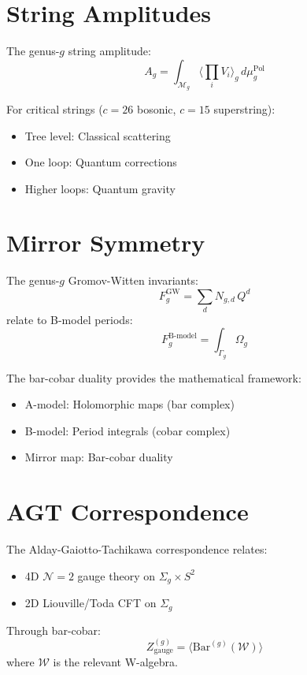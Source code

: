 \section{String Amplitudes}

The genus-$g$ string amplitude:
$$A_g = \int_{\mathcal{M}_g} \langle \prod_i V_i \rangle_g \, d\mu_g^{\text{Pol}}$$

For critical strings ($c=26$ bosonic, $c=15$ superstring):
\begin{itemize}
\item Tree level: Classical scattering
\item One loop: Quantum corrections
\item Higher loops: Quantum gravity
\end{itemize}

\section{Mirror Symmetry}

The genus-$g$ Gromov-Witten invariants:
$$F_g^{\text{GW}} = \sum_{d} N_{g,d} \, Q^d$$
relate to B-model periods:
$$F_g^{\text{B-model}} = \int_{\Gamma_g} \Omega_g$$

The bar-cobar duality provides the mathematical framework:
\begin{itemize}
\item A-model: Holomorphic maps (bar complex)
\item B-model: Period integrals (cobar complex)
\item Mirror map: Bar-cobar duality
\end{itemize}

\section{AGT Correspondence}

The Alday-Gaiotto-Tachikawa correspondence relates:
\begin{itemize}
\item 4D $\mathcal{N}=2$ gauge theory on $\Sigma_g \times S^2$
\item 2D Liouville/Toda CFT on $\Sigma_g$
\end{itemize}

Through bar-cobar:
$$Z_{\text{gauge}}^{(g)} = \langle \text{Bar}^{(g)}(\mathcal{W}) \rangle$$
where $\mathcal{W}$ is the relevant W-algebra.
